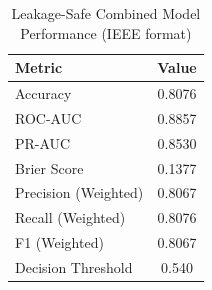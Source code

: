 \begin{table}[h]
\centering
\caption{Leakage-Safe Combined Model Performance (IEEE format)}
\label{tab:performance_metrics}
\begin{tabular}{lc}
\hline
Metric & Value \\
\hline
Accuracy & 0.8076 \\
ROC-AUC & 0.8857 \\
PR-AUC & 0.8530 \\
Brier Score & 0.1377 \\
Precision (Weighted) & 0.8067 \\
Recall (Weighted) & 0.8076 \\
F1 (Weighted) & 0.8067 \\
Decision Threshold & 0.540 \\
\hline
\end{tabular}
\end{table}